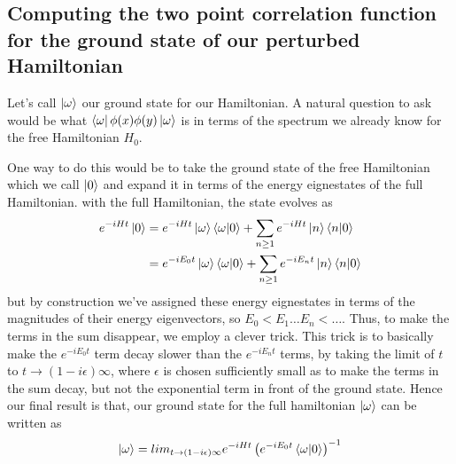 \subsection{ Computing the two point correlation function for the ground state of our perturbed Hamiltonian } 
Let's call $\ket {\omega } $ our ground state for our Hamiltonian. A natural question to ask would be what $\bra {\omega } \phi(x) \phi( y ) \ket{\omega} $ is in terms of the spectrum we already know for the free Hamiltonian $H_0$.

One way to do this would be to take the ground state of the free Hamiltonian which we call $\ket{ 0 } $ and expand it in terms of the energy eignestates of the full Hamiltonian. with the full Hamiltonian, the state evolves as \begin{align*} e^{- iHt}\ket{0} &= e^{ - iHt } \ket{\omega}\bra{ \omega }\ket{0} + \sum_{ n \geq 1 }  e^ { -iHt } \ket{n}\bra{n}\ket{ 0 } \\
&= e^ { - iE_0 t } \ket{ \omega }\bra{\omega}\ket{0} + \sum_{n \geq 1} e^{ - i E_n t }\ket{n}\bra{n}\ket{0}   \end{align*}
but by construction we've assigned these energy eignestates in terms of the magnitudes of their energy eigenvectors, so $E_0 < E_1 \dots E_n < \dots $. Thus, to make the terms in the sum disappear, we employ a clever trick. This trick is to basically make the $e^{ - i E_0 t} $ term decay slower than the $e^ { - iE_n t} $ terms, by taking the limit of $t$ to $t \rightarrow (1 - i\epsilon )\infty$, where $\epsilon$ is chosen sufficiently small as to make the terms in the sum decay, but not the exponential term in front of the ground state. Hence our final result is that, our ground state for the full hamiltonian $\ket{\omega} $ can be written as \[ \ket{ \omega} = lim_{t \rightarrow (1  -i \epsilon)\infty  }e^{ - i Ht } \left( e^{ - i E_0 t}\bra{\omega}\ket{0} \right)^{- 1} \]

